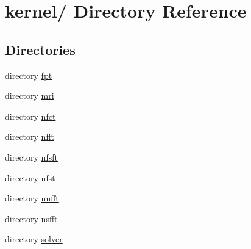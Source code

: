 \hypertarget{dir_000003}{
\section{kernel/ Directory Reference}
\label{dir_000003}
}
\subsection*{Directories}
\begin{CompactItemize}
\item 
directory \hyperlink{dir_000019}{fpt}
\item 
directory \hyperlink{dir_000023}{mri}
\item 
directory \hyperlink{dir_000024}{nfct}
\item 
directory \hyperlink{dir_000025}{nfft}
\item 
directory \hyperlink{dir_000004}{nfsft}
\item 
directory \hyperlink{dir_000026}{nfst}
\item 
directory \hyperlink{dir_000027}{nnfft}
\item 
directory \hyperlink{dir_000028}{nsfft}
\item 
directory \hyperlink{dir_000034}{solver}
\end{CompactItemize}
